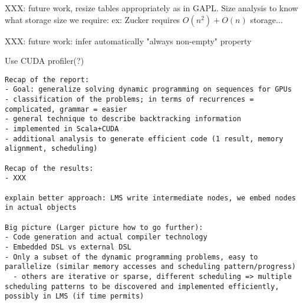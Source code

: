 XXX: future work, resize tables appropriately as in GAPL.
{\color{red} Size analysis to know what storage size we require: ex: Zucker requires $O(n^2)+O(n)$ storage...}

XXX: future work: infer automatically "always non-empty" property

{\color{red} Use CUDA profiler(?)}


\begin{verbatim}
Recap of the report:
- Goal: generalize solving dynamic programming on sequences for GPUs
- classification of the problems; in terms of recurrences = complicated, grammar = easier
- general technique to describe backtracking information
- implemented in Scala+CUDA
- additional analysis to generate efficient code (1 result, memory alignment, scheduling)

Recap of the results:
- XXX

explain better approach: LMS write intermediate nodes, we embed nodes in actual objects

Big picture (Larger picture how to go further):
- Code generation and actual compiler technology
- Embedded DSL vs external DSL
- Only a subset of the dynamic programming problems, easy to parallelize (similar memory accesses and scheduling pattern/progress)
  - others are iterative or sparse, different scheduling => multiple scheduling patterns to be discovered and implemented efficiently, possibly in LMS (if time permits)
\end{verbatim}

